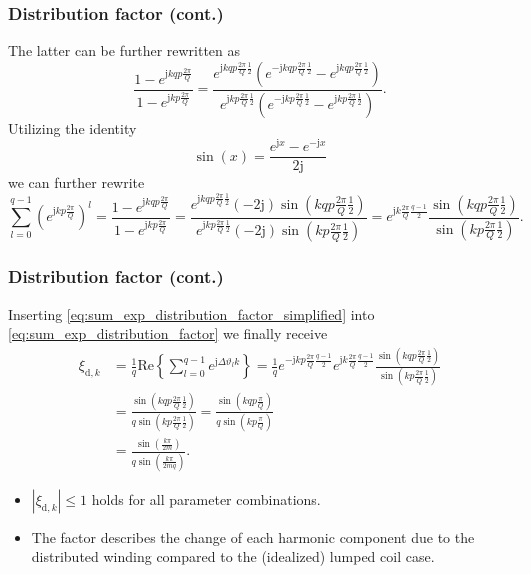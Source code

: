 \begin{frame}
	\frametitle{Distribution factor  (cont.)}
    The latter can be further rewritten as
    $$
    \frac{1-e^{\mathrm{j} k q p\frac{2\pi}{Q}}}{1-e^{\mathrm{j} k p\frac{2\pi}{Q}}} = \frac{e^{\mathrm{j} k q p\frac{2\pi}{Q}\frac{1}{2}}\left(e^{-\mathrm{j} k q p\frac{2\pi}{Q}\frac{1}{2}}-e^{\mathrm{j} k q p\frac{2\pi}{Q}\frac{1}{2}}\right)}{e^{\mathrm{j} k p\frac{2\pi}{Q}\frac{1}{2}}\left(e^{-\mathrm{j} k p\frac{2\pi}{Q}\frac{1}{2}}-e^{\mathrm{j} k p\frac{2\pi}{Q}\frac{1}{2}}\right)}.
    $$
    Utilizing the identity
    $$
    \sin(x) = \frac{e^{\mathrm{j} x}-e^{-\mathrm{j} x}}{2\mathrm{j}}
    $$
    we can further rewrite
    \begin{equation}
        \sum_{l=0}^{q-1} \left(e^{\mathrm{j} k  p\frac{2\pi}{Q}}\right)^l =\frac{1-e^{\mathrm{j} k q p\frac{2\pi}{Q}}}{1-e^{\mathrm{j} k p\frac{2\pi}{Q}}} = \frac{e^{\mathrm{j} k q p\frac{2\pi}{Q}\frac{1}{2}}(-2\mathrm{j})\sin(k q p\frac{2\pi}{Q}\frac{1}{2})}{e^{\mathrm{j} k p\frac{2\pi}{Q}\frac{1}{2}}(-2\mathrm{j})\sin(k p\frac{2\pi}{Q}\frac{1}{2})}=e^{\mathrm{j}k\frac{2 \pi}{Q}\frac{q-1}{2}}\frac{\sin(k q p\frac{2\pi}{Q}\frac{1}{2})}{\sin(k p\frac{2\pi}{Q}\frac{1}{2})}.
        \label{eq:sum_exp_distribution_factor_simplified}
    \end{equation}
\end{frame}

\begin{frame}
	\frametitle{Distribution factor  (cont.)}
    Inserting \eqref{eq:sum_exp_distribution_factor_simplified} into \eqref{eq:sum_exp_distribution_factor} we finally receive
    \begin{equation}
        \begin{split}
        \xi_{\mathrm{d},k} &= \frac{1}{q}\mathrm{Re}\left\{\sum_{l=0}^{q-1} e^{\mathrm{j} \Delta\vartheta_l k}\right\} = \frac{1}{q} e^{- \mathrm{j} k p\frac{2\pi}{Q} \frac{q-1}{2} } e^{\mathrm{j}k\frac{2 \pi}{Q}\frac{q-1}{2}}\frac{\sin(k q p\frac{2\pi}{Q}\frac{1}{2})}{\sin(k p\frac{2\pi}{Q}\frac{1}{2})}\\
            &= \frac{\sin(k q p\frac{2\pi}{Q}\frac{1}{2})}{q\sin(k p\frac{2\pi}{Q}\frac{1}{2})} = \frac{\sin(k q p \frac{\pi}{Q})}{q\sin(k p \frac{\pi}{Q})}\\
            &= \frac{\sin\left(\frac{k \pi}{2 m}\right)}{q\sin\left(\frac{k \pi}{2 m q}\right)}.
    \end{split}
    \end{equation}
    \begin{itemize}
        \item $|\xi_{\mathrm{d},k}| \leq 1$ holds for all parameter combinations.
        \item The factor describes the change of each harmonic component due to the distributed winding compared to the (idealized) lumped coil case.
    \end{itemize}
\end{frame}

